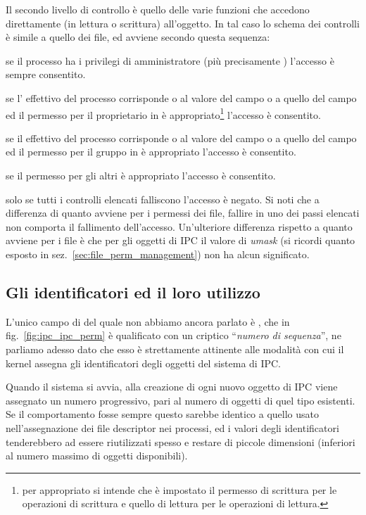 Il secondo livello di controllo è quello delle varie funzioni che accedono
direttamente (in lettura o scrittura) all'oggetto. In tal caso lo schema dei
controlli è simile a quello dei file, ed avviene secondo questa sequenza:
\begin{itemize*}
\item se il processo ha i privilegi di amministratore (più precisamente
  ) l'accesso è sempre consentito.
\item se l' effettivo del processo corrisponde o al valore del campo
   o a quello del campo  ed il permesso per il proprietario
  in  è appropriato\footnote{per appropriato si intende che è
    impostato il permesso di scrittura per le operazioni di scrittura e quello
    di lettura per le operazioni di lettura.} l'accesso è consentito.
\item se il  effettivo del processo corrisponde o al
  valore del campo  o a quello del campo  ed il permesso
  per il gruppo in  è appropriato l'accesso è consentito.
\item se il permesso per gli altri è appropriato l'accesso è consentito.
\end{itemize*}
solo se tutti i controlli elencati falliscono l'accesso è negato. Si noti che
a differenza di quanto avviene per i permessi dei file, fallire in uno dei
passi elencati non comporta il fallimento dell'accesso. Un'ulteriore
differenza rispetto a quanto avviene per i file è che per gli oggetti di IPC
il valore di \textit{umask} (si ricordi quanto esposto in
sez.~\ref{sec:file_perm_management}) non ha alcun significato.


\subsection{Gli identificatori ed il loro utilizzo}
\label{sec:ipc_sysv_id_use}

L'unico campo di  del quale non abbiamo ancora parlato è
, che in fig.~\ref{fig:ipc_ipc_perm} è qualificato con un criptico
``\textsl{numero di sequenza}'', ne parliamo adesso dato che esso è
strettamente attinente alle modalità con cui il kernel assegna gli
identificatori degli oggetti del sistema di IPC.

Quando il sistema si avvia, alla creazione di ogni nuovo oggetto di IPC viene
assegnato un numero progressivo, pari al numero di oggetti di quel tipo
esistenti. Se il comportamento fosse sempre questo sarebbe identico a quello
usato nell'assegnazione dei file descriptor nei processi, ed i valori degli
identificatori tenderebbero ad essere riutilizzati spesso e restare di piccole
dimensioni (inferiori al numero massimo di oggetti disponibili).

